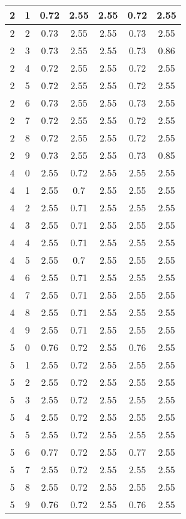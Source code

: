 \begin{longtable}{|c|c||c||c|c||c|c|}
	2 & 1 & 0.72 & 2.55 & 2.55 & 0.72 & 2.55 \\ \hline
	2 & 2 & 0.73 & 2.55 & 2.55 & 0.73 & 2.55 \\ \hline
	2 & 3 & 0.73 & 2.55 & 2.55 & 0.73 & 0.86 \\ \hline
	2 & 4 & 0.72 & 2.55 & 2.55 & 0.72 & 2.55 \\ \hline
	2 & 5 & 0.72 & 2.55 & 2.55 & 0.72 & 2.55 \\ \hline
	2 & 6 & 0.73 & 2.55 & 2.55 & 0.73 & 2.55 \\ \hline
	2 & 7 & 0.72 & 2.55 & 2.55 & 0.72 & 2.55 \\ \hline
	2 & 8 & 0.72 & 2.55 & 2.55 & 0.72 & 2.55 \\ \hline
	2 & 9 & 0.73 & 2.55 & 2.55 & 0.73 & 0.85 \\ \hline
	4 & 0 & 2.55 & 0.72 & 2.55 & 2.55 & 2.55 \\ \hline
	4 & 1 & 2.55 & 0.7 & 2.55 & 2.55 & 2.55 \\ \hline
	4 & 2 & 2.55 & 0.71 & 2.55 & 2.55 & 2.55 \\ \hline
	4 & 3 & 2.55 & 0.71 & 2.55 & 2.55 & 2.55 \\ \hline
	4 & 4 & 2.55 & 0.71 & 2.55 & 2.55 & 2.55 \\ \hline
	4 & 5 & 2.55 & 0.7 & 2.55 & 2.55 & 2.55 \\ \hline
	4 & 6 & 2.55 & 0.71 & 2.55 & 2.55 & 2.55 \\ \hline
	4 & 7 & 2.55 & 0.71 & 2.55 & 2.55 & 2.55 \\ \hline
	4 & 8 & 2.55 & 0.71 & 2.55 & 2.55 & 2.55 \\ \hline
	4 & 9 & 2.55 & 0.71 & 2.55 & 2.55 & 2.55 \\ \hline
	5 & 0 & 0.76 & 0.72 & 2.55 & 0.76 & 2.55 \\ \hline
	5 & 1 & 2.55 & 0.72 & 2.55 & 2.55 & 2.55 \\ \hline
	5 & 2 & 2.55 & 0.72 & 2.55 & 2.55 & 2.55 \\ \hline
	5 & 3 & 2.55 & 0.72 & 2.55 & 2.55 & 2.55 \\ \hline
	5 & 4 & 2.55 & 0.72 & 2.55 & 2.55 & 2.55 \\ \hline
	5 & 5 & 2.55 & 0.72 & 2.55 & 2.55 & 2.55 \\ \hline
	5 & 6 & 0.77 & 0.72 & 2.55 & 0.77 & 2.55 \\ \hline
	5 & 7 & 2.55 & 0.72 & 2.55 & 2.55 & 2.55 \\ \hline
	5 & 8 & 2.55 & 0.72 & 2.55 & 2.55 & 2.55 \\ \hline
	5 & 9 & 0.76 & 0.72 & 2.55 & 0.76 & 2.55 \\ \hline

\end{longtable}
